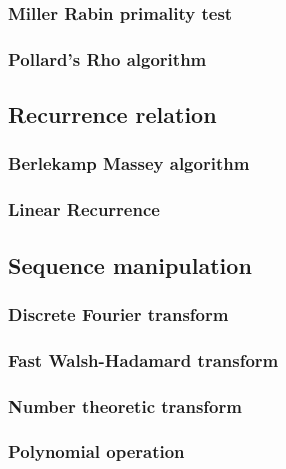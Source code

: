 \documentclass[titlepage,a4paper,10pt]{article}
\begin{document}
\begin{multicols}{2}
\begin{spacing}{0.8}
{				\subsubsection{Miller Rabin primality test}
					
				\subsubsection{Pollard's Rho algorithm}
					
			\subsection{Recurrence relation}
				\subsubsection{Berlekamp Massey algorithm}
					
				\subsubsection{Linear Recurrence}
					
			\subsection{Sequence manipulation}
				\subsubsection{Discrete Fourier transform}
					
				\subsubsection{Fast Walsh-Hadamard transform}
					
				\subsubsection{Number theoretic transform}
					
				\subsubsection{Polynomial operation}
					
}
\end{spacing}
\end{multicols}
\end{document}
